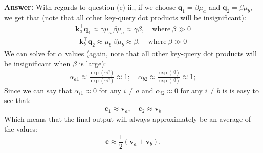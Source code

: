 \documentclass[letterpaper,12pt]{article}
\begin{document}
\begin{itemize}
		\textcolor{blue!70}{\textbf{Answer:} With regards to question (c) ii., if we choose $\mathbf{q}_1 = \beta \mu_a$ and $\mathbf{q}_2 = \beta \mu_b$, we get that (note that all other key-query dot products will be insignificant):
		\begin{equation*}
			\begin{aligned}
				\mathbf{k}_a^\top \mathbf{q}_1 \approx \gamma \mu_a^\top \beta \mu_a \approx \gamma \beta, \quad \text{where} \ \beta \gg 0
			\end{aligned}
		\end{equation*}
		\begin{equation*}
			\begin{aligned}
				\mathbf{k}_b^\top \mathbf{q}_2 \approx \mu_b^\top \beta  \mu_b \approx \beta, \quad \text{where} \ \beta \gg 0
			\end{aligned}
		\end{equation*}
		We can solve for $\alpha$ values (again, note that all other key-query dot products will be insignificant when $\beta$ is large):
		\begin{equation*}
			\begin{aligned}
				\alpha_{a1} \approx \frac{\exp(\gamma\beta)}{\exp(\gamma\beta)} \approx 1; \quad \alpha_{b2} \approx \frac{\exp(\beta)}{\exp(\beta)} \approx 1;
			\end{aligned}
		\end{equation*}
		Since we can say that $\alpha_{i1} \approx 0$ for any $i\neq a$ and $\alpha_{i2} \approx 0$ for any $i\neq b$ is is easy to see that:
		\begin{equation*}
			\begin{aligned}
				\mathbf{c}_1 \approx \mathbf{v}_a, \quad \mathbf{c}_2 \approx \mathbf{v}_b
			\end{aligned}
		\end{equation*}
		Which means that the final output will always approximately be an average of the values:
		\begin{equation*}
			\mathbf{c} \approx \frac{1}{2} (\mathbf{v}_a + \mathbf{v}_b).
		\end{equation*}
		}
	\end{itemize}	

		
		
	
\end{document}
